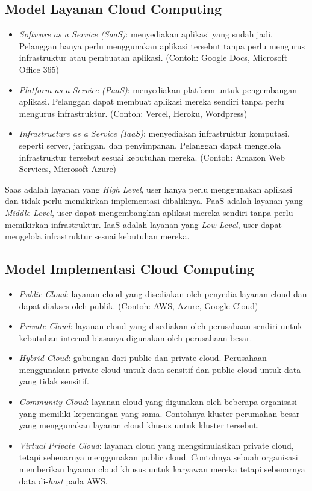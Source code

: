 \documentclass[conference]{IEEEtran}
\begin{document}
\subsection{Model Layanan Cloud Computing}

\begin{itemize}
    \item \textit{Software as a Service (SaaS)}: menyediakan aplikasi yang sudah jadi. Pelanggan hanya perlu menggunakan aplikasi tersebut tanpa perlu mengurus infrastruktur atau pembuatan aplikasi. (Contoh: Google Docs, Microsoft Office 365)
    \item \textit{Platform as a Service (PaaS)}: menyediakan platform untuk pengembangan aplikasi. Pelanggan dapat membuat aplikasi mereka sendiri tanpa perlu mengurus infrastruktur. (Contoh: Vercel, Heroku, Wordpress)
    \item \textit{Infrastructure as a Service (IaaS)}: menyediakan infrastruktur komputasi, seperti server, jaringan, dan penyimpanan. Pelanggan dapat mengelola infrastruktur tersebut sesuai kebutuhan mereka. (Contoh: Amazon Web Services, Microsoft Azure)
\end{itemize}

Saas adalah layanan yang \textit{High Level}, user hanya perlu menggunakan aplikasi dan tidak perlu memikirkan implementasi dibaliknya. PaaS adalah layanan yang \textit{Middle Level}, user dapat mengembangkan aplikasi mereka sendiri tanpa perlu memikirkan infrastruktur. IaaS adalah layanan yang \textit{Low Level}, user dapat mengelola infrastruktur sesuai kebutuhan mereka.

\subsection{Model Implementasi Cloud Computing}

\begin{itemize}
    \item \textit{Public Cloud}: layanan cloud yang disediakan oleh penyedia layanan cloud dan dapat diakses oleh publik. (Contoh: AWS, Azure, Google Cloud)
    \item \textit{Private Cloud}: layanan cloud yang disediakan oleh perusahaan sendiri untuk kebutuhan internal biasanya digunakan oleh perusahaan besar. 
    \item \textit{Hybrid Cloud}: gabungan dari public dan private cloud. Perusahaan menggunakan private cloud untuk data sensitif dan public cloud untuk data yang tidak sensitif.
    \item \textit{Community Cloud}: layanan cloud yang digunakan oleh beberapa organisasi yang memiliki kepentingan yang sama. Contohnya kluster perumahan besar yang menggunakan layanan cloud khusus untuk kluster tersebut.
    \item \textit{Virtual Private Cloud}: layanan cloud yang mengsimulasikan private cloud, tetapi sebenarnya menggunakan public cloud. Contohnya sebuah organisasi memberikan layanan cloud khusus untuk karyawan mereka tetapi sebenarnya data di-\textit{host} pada AWS.
\end{itemize}
\end{document}
